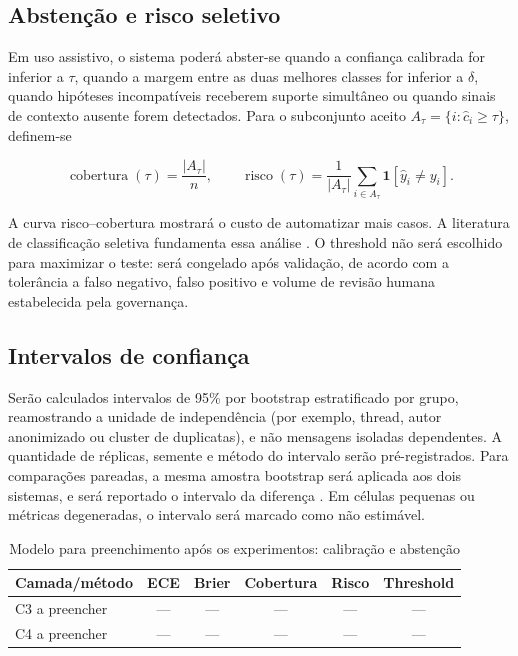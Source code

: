 \subsection{Abstenção e risco seletivo}

Em uso assistivo, o sistema poderá abster-se quando a confiança calibrada for inferior a \(\tau\), quando a margem entre as duas melhores classes for inferior a \(\delta\), quando hipóteses incompatíveis receberem suporte simultâneo ou quando sinais de contexto ausente forem detectados. Para o subconjunto aceito \(A_\tau=\{i:\widehat c_i\geq\tau\}\), definem-se

\[
\operatorname{cobertura}(\tau)=\frac{|A_\tau|}{n},\qquad
\operatorname{risco}(\tau)=\frac{1}{|A_\tau|}\sum_{i\in A_\tau}\mathbf{1}[\widehat y_i\neq y_i].
\]

A curva risco--cobertura mostrará o custo de automatizar mais casos. A literatura de classificação seletiva fundamenta essa análise \cite{geifmangulyaniv2017}. O threshold não será escolhido para maximizar o teste: será congelado após validação, de acordo com a tolerância a falso negativo, falso positivo e volume de revisão humana estabelecida pela governança.

\subsection{Intervalos de confiança}

Serão calculados intervalos de 95\% por bootstrap estratificado por grupo, reamostrando a unidade de independência (por exemplo, thread, autor anonimizado ou cluster de duplicatas), e não mensagens isoladas dependentes. A quantidade de réplicas, semente e método do intervalo serão pré-registrados. Para comparações pareadas, a mesma amostra bootstrap será aplicada aos dois sistemas, e será reportado o intervalo da diferença \cite{efrontibshirani1993}. Em células pequenas ou métricas degeneradas, o intervalo será marcado como não estimável.

\begin{table}[htbp]
\centering
\caption{Modelo para preenchimento após os experimentos: calibração e abstenção}
\label{tab:resultados-calibracao}
\begin{tabular}{|l|c|c|c|c|c|}
\hline
\textbf{Camada/método} & \textbf{ECE} & \textbf{Brier} & \textbf{Cobertura} & \textbf{Risco} & \textbf{Threshold} \\
\hline
C3 a preencher & --- & --- & --- & --- & --- \\
\hline
C4 a preencher & --- & --- & --- & --- & --- \\
\hline
\end{tabular}
\end{table}

